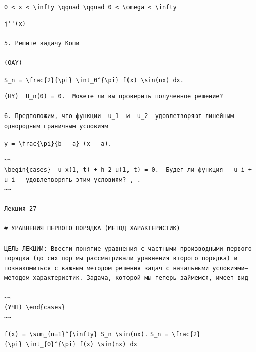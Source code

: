 \documentclass[
  ukrainian,
]{article}
\begin{document}
\texttt{0\ \textless{}\ x\ \textless{}\ \textbackslash{}infty\ \textbackslash{}qquad\ \textbackslash{}qquad\ 0\ \textless{}\ \textbackslash{}omega\ \textless{}\ \textbackslash{}infty}

\begin{verbatim}
j''(x)

5. Решите задачу Коши

(OAY)
\end{verbatim}

\texttt{S\_n\ =\ \textbackslash{}frac\{2\}\{\textbackslash{}pi\}\ \textbackslash{}int\_0\^{}\{\textbackslash{}pi\}\ f(x)\ \textbackslash{}sin(nx)\ dx.}

\begin{verbatim}
(HY)  U_n(0) = 0.  Можете ли вы проверить полученное решение?

6. Предположим, что функции  u_1  и  u_2  удовлетворяют линейным однородным граничным условиям
\end{verbatim}

\texttt{y\ =\ \textbackslash{}frac\{\textbackslash{}pi\}\{b\ -\ a\}\ (x\ -\ a).}

\begin{verbatim}
~~
\begin{cases}  u_x(1, t) + h_2 u(1, t) = 0.  Будет ли функция   u_i + u_i   удовлетворять этим условиям? , .
~~

Лекция 27

# УРАВНЕНИЯ ПЕРВОГО ПОРЯДКА (МЕТОД ХАРАКТЕРИСТИК)

ЦЕЛЬ ЛЕКЦИИ: Ввести понятие уравнения с частными производными первого порядка (до сих пор мы рассматривали уравнения второго порядка) и познакомиться с важным методом решения задач с начальными условиями—методом характеристик. Задача, которой мы теперь займемся, имеет вид

~~
(УЧП) \end{cases}
~~
\end{verbatim}

\texttt{f(x)\ =\ \textbackslash{}sum\_\{n=1\}\^{}\{\textbackslash{}infty\}\ S\_n\ \textbackslash{}sin(nx).}
\texttt{S\_n\ =\ \textbackslash{}frac\{2\}\{\textbackslash{}pi\}\ \textbackslash{}int\_\{0\}\^{}\{\textbackslash{}pi\}\ f(x)\ \textbackslash{}sin(nx)\ dx}
\end{document}
